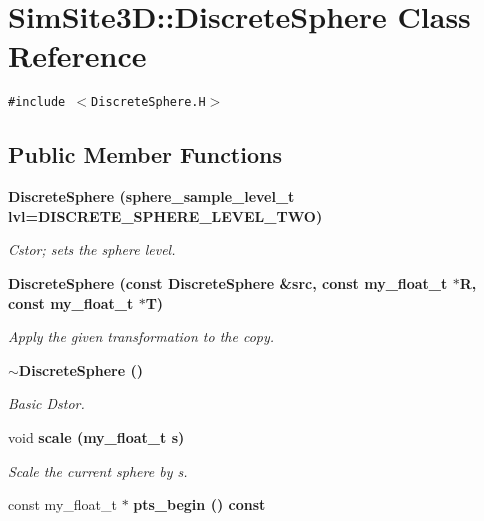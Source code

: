 \section{SimSite3D::Discrete\-Sphere Class Reference}
\label{classSimSite3D_1_1DiscreteSphere}
{\tt \#include $<$Discrete\-Sphere.H$>$}

\subsection*{Public Member Functions}
\begin{CompactItemize}
\item 
\bf{Discrete\-Sphere} (sphere\_\-sample\_\-level\_\-t lvl=DISCRETE\_\-SPHERE\_\-LEVEL\_\-TWO)\label{classSimSite3D_1_1DiscreteSphere_e621966eb3054dab3f2f9798bca76a6b}

\begin{CompactList}\small\item\em Cstor; sets the sphere level. \item\end{CompactList}\item 
\bf{Discrete\-Sphere} (const \bf{Discrete\-Sphere} \&src, const my\_\-float\_\-t $\ast$R, const my\_\-float\_\-t $\ast$T)\label{classSimSite3D_1_1DiscreteSphere_d712606834a92c7735f3522a9c1983dc}

\begin{CompactList}\small\item\em Apply the given transformation to the copy. \item\end{CompactList}\item 
\bf{$\sim$Discrete\-Sphere} ()\label{classSimSite3D_1_1DiscreteSphere_0e4e024bf87c9f629c58e96e405a48e9}

\begin{CompactList}\small\item\em Basic Dstor. \item\end{CompactList}\item 
void \bf{scale} (my\_\-float\_\-t s)\label{classSimSite3D_1_1DiscreteSphere_499dd540bc049f849618e63141a762c9}

\begin{CompactList}\small\item\em Scale the current sphere by s. \item\end{CompactList}\item 
const my\_\-float\_\-t $\ast$ \bf{pts\_\-begin} () const \label{classSimSite3D_1_1DiscreteSphere_cc1900a41dc02c937dee4964eb40f805}


\end{CompactItemize}
